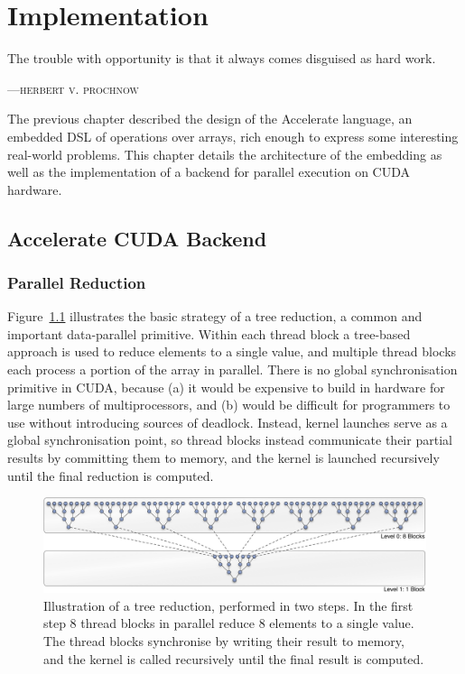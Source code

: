 
\chapter{Implementation}
\epigraph{The trouble with opportunity is that it always comes disguised as hard work.}%
{\textsc{---herbert v. prochnow}}


The previous chapter described the design of the Accelerate language, an
embedded DSL of operations over arrays, rich enough to express some interesting
real-world problems. This chapter details the architecture of the embedding as
well as the implementation of a backend for parallel execution on CUDA hardware.

\section{Accelerate CUDA Backend}
\subsection{Parallel Reduction}
\label{sec:parallel_reduction}

Figure~\ref{fig:tree_reduction} illustrates the basic strategy of a tree
reduction, a common and important data-parallel primitive. Within each thread
block a tree-based approach is used to reduce elements to a single value, and
multiple thread blocks each process a portion of the array in parallel. There is
no global synchronisation primitive in CUDA, because (a) it would be expensive
to build in hardware for large numbers of multiprocessors, and (b) would be
difficult for programmers to use without introducing sources of deadlock.
Instead, kernel launches serve as a global synchronisation point, so thread
blocks instead communicate their partial results by committing them to memory,
and the kernel is launched recursively until the final reduction is computed.

\begin{figure}[htbp]
    \begin{center}
        \includegraphics[width=\textwidth]{images/sec-4/tree-reduction}
    \end{center}
    \caption[A parallel tree reduction]{Illustration of a tree reduction,
        performed in two steps. In the first step 8 thread blocks in parallel
        reduce 8 elements to a single value. The thread blocks synchronise by
        writing their result to memory, and the kernel is called recursively
        until the final result is computed.}
    \label{fig:tree_reduction}
\end{figure}

